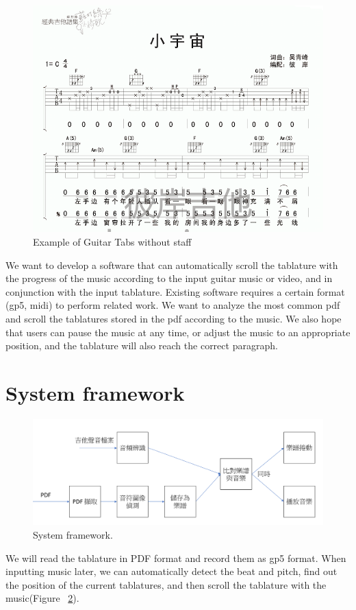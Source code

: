 \documentclass[10pt,twocolumn,letterpaper]{article}
\begin{document}
\begin{CJK}{UTF8}{bsmi}
\begin{figure}[t]
\begin{center}
   \includegraphics[width=0.9\linewidth]{tab2.png}
\end{center}
\caption{Example of Guitar Tabs without staff\cite{small_universe}}
\label{fig:long}
\label{fig:tab2}
\end{figure}

We want to develop a software that can automatically scroll the tablature with the progress of the music according to the input guitar music or video, and in conjunction with the input tablature. Existing software requires a certain format (gp5, midi) to perform related work. We want to analyze the most common pdf and scroll the tablatures stored in the pdf according to the music. We also hope that users can pause the music at any time, or adjust the music to an appropriate position, and the tablature will also reach the correct paragraph.

\section{System framework}

\begin{figure}
\begin{center}
    \includegraphics[width=1\linewidth]{step1.png}
\end{center}
   \caption{System framework.}
\label{fig:step1}
\end{figure}
We will read the tablature in PDF format and record them as gp5 format. When inputting music later, we can automatically detect the beat and pitch, find out the position of the current tablatures, and then scroll the tablature with the music(Figure ~\ref{fig:step1}). 



\end{CJK}
\end{document}
